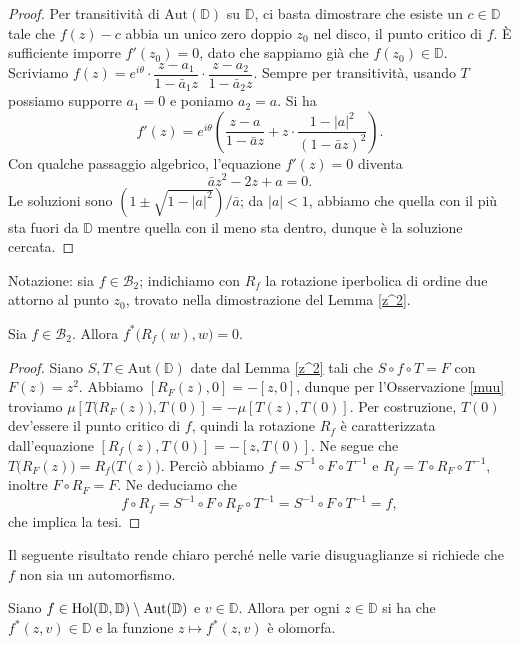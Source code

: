 \begin{proof}
  Per transitività di $\text{Aut}(\mathbb{D})$ su $\mathbb{D}$, ci basta dimostrare che esiste un $c \in \mathbb{D}$ tale che $f(z)-c$ abbia un unico zero doppio $z_0$ nel disco, il punto critico di $f$. È sufficiente imporre $f'(z_0)=0$, dato che sappiamo già che $f(z_0) \in \mathbb{D}$. Scriviamo $f(z)=e^{i\theta}\cdot\dfrac{z-a_1}{1-\bar{a}_1z}\cdot\dfrac{z-a_2}{1-\bar{a}_2z}$.
  Sempre per transitività, usando $T$ possiamo supporre $a_1=0$ e poniamo $a_2=a$. Si ha
  $$f'(z)=e^{i\theta}\left(\frac{z-a}{1-\bar{a}z}+z\cdot\frac{1-|a|^2}{(1-\bar{a}z)^2}\right).$$
  Con qualche passaggio algebrico, l'equazione $f'(z)=0$ diventa
  $$\bar{a}z^2-2z+a=0.$$
  Le soluzioni sono $(1 \pm \sqrt{1-|a|^2})/\bar{a}$; da $|a|<1$, abbiamo che quella con il più sta fuori da $\mathbb{D}$ mentre quella con il meno sta dentro, dunque è la soluzione cercata.
\end{proof}

Notazione: sia $f \in \mathcal{B}_2$; indichiamo con $R_f$ la rotazione iperbolica di ordine due attorno al punto $z_0$, trovato nella dimostrazione del Lemma \ref{z^2}.

\begin{cor} \label{rotazioni}
  Sia $f \in \mathcal{B}_2$. Allora $f^*\bigl(R_f(w),w\bigr)=0$.
\end{cor}

\begin{proof}
  Siano $S, T \in \text{Aut}(\mathbb{D})$ date dal Lemma \ref{z^2} tali che $S\circ f\circ T=F$ con $F(z)=z^2$. Abbiamo $[R_F(z),0]=-[z,0]$, dunque per l'Osservazione \ref{muu} troviamo $\mu\left[T\bigl(R_F(z)\bigr),T(0)\right]=-\mu[T(z),T(0)]$.
  Per costruzione, $T(0)$ dev'essere il punto critico di $f$, quindi la rotazione $R_f$ è caratterizzata dall'equazione $[R_f(z),T(0)]=-[z,T(0)]$. Ne segue che $T\bigl(R_F(z)\bigr)=R_f\bigl(T(z)\bigr)$. Perciò abbiamo $f=S^{-1}\circ F\circ T^{-1}$ e $R_f=T\circ R_F\circ T^{-1}$, inoltre $F\circ R_F=F$. Ne deduciamo che
  $$f\circ R_f=S^{-1}\circ F\circ R_F\circ T^{-1}=S^{-1}\circ F\circ T^{-1}=f,$$
  che implica la tesi.
\end{proof}

Il seguente risultato rende chiaro perché nelle varie disuguaglianze si richiede che $f$ non sia un automorfismo.

\begin{prop} \label{24}
  Siano $f \in \text{\normalfont{Hol}}(\mathbb{D},\mathbb{D})\setminus\text{\normalfont{Aut}}(\mathbb{D})$ e $v \in \mathbb{D}$. Allora per ogni $z \in \mathbb{D}$ si ha che $f^*(z,v) \in \mathbb{D}$ e la funzione $z \longmapsto f^*(z,v)$ è olomorfa.
\end{prop}

